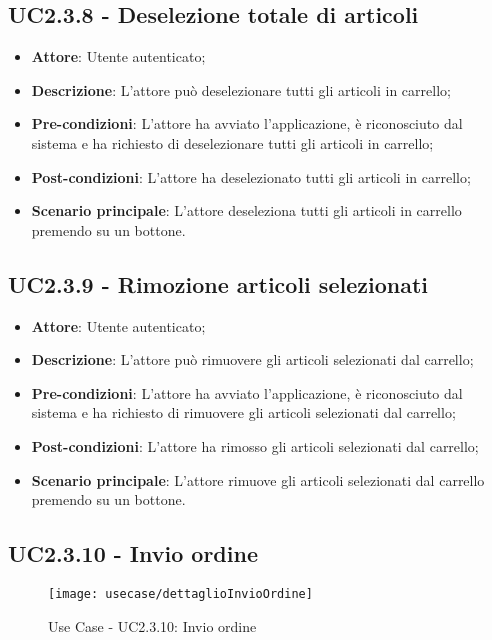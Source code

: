 \subsection{UC2.3.8 - Deselezione totale di articoli}

\begin{itemize}
	\item \textbf{Attore}: Utente autenticato;
	\item \textbf{Descrizione}: L'attore può deselezionare tutti gli articoli in carrello;
	\item \textbf{Pre-condizioni}: L'attore ha avviato l'applicazione, è riconosciuto dal sistema e ha richiesto di deselezionare tutti gli articoli in carrello;
	\item \textbf{Post-condizioni}: L'attore ha deselezionato tutti gli articoli in carrello;
	\item \textbf{Scenario principale}: L'attore deseleziona tutti gli articoli in carrello premendo su un bottone.
\end{itemize}

\subsection{UC2.3.9 - Rimozione articoli selezionati}

\begin{itemize}
	\item \textbf{Attore}: Utente autenticato;
	\item \textbf{Descrizione}: L'attore può rimuovere gli articoli selezionati dal carrello;
	\item \textbf{Pre-condizioni}: L'attore ha avviato l'applicazione, è riconosciuto dal sistema e ha richiesto di rimuovere gli articoli selezionati dal carrello;
	\item \textbf{Post-condizioni}: L'attore ha rimosso gli articoli selezionati dal carrello;
	\item \textbf{Scenario principale}: L'attore rimuove gli articoli selezionati dal carrello premendo su un bottone.
\end{itemize}

\newpage

\subsection{UC2.3.10 - Invio ordine}

\begin{figure}[!h] 
    \centering 
    \texttt{[image: usecase/dettaglioInvioOrdine]} 
    \caption{Use Case - UC2.3.10: Invio ordine}
\end{figure}

